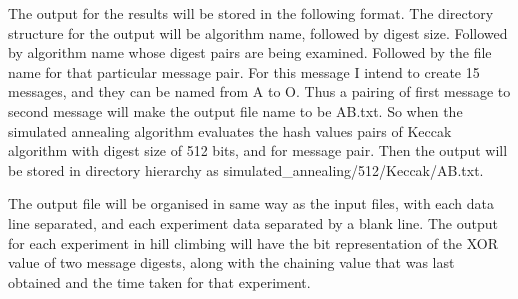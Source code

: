 \documentclass[12pt]{artikel3}                  %
\begin{document}
The output for the results will be stored in the following format. The directory structure for the
output will be algorithm name, followed by digest size. Followed by algorithm name whose digest 
pairs are being examined. Followed by the file name for that particular message pair. For this message 
I intend to create 15 messages, and they can be named from A to O. Thus a pairing of first message to 
second message will make the output file name to be AB.txt. So when the simulated annealing algorithm 
evaluates the hash values pairs of Keccak algorithm with digest size of 512 bits, and for message pair.
Then the output will be stored in directory hierarchy as simulated\_annealing/512/Keccak/AB.txt.

The output file will be organised in same way as the input files, with each data line separated, and 
each experiment data separated by a blank line. The output for each experiment in hill climbing will
have the bit representation of the XOR value of two message digests, along with the chaining value
that was last obtained and the time taken for that experiment.
\end{document}
